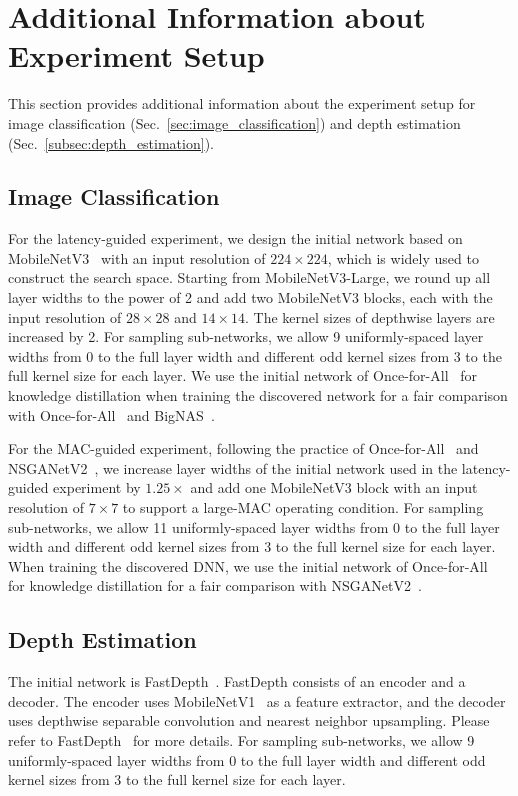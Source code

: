 \section{Additional Information about Experiment Setup}
This section provides additional information about the experiment setup for image classification (Sec.~\ref{sec:image_classification}) and depth estimation (Sec.~\ref{subsec:depth_estimation}).

\subsection{Image Classification}

For the latency-guided experiment, we design the initial network based on MobileNetV3~\cite{Howard_2019_ICCV} with an input resolution of $224\times224$, which is widely used to construct the search space. Starting from MobileNetV3-Large, we round up all layer widths to the power of 2 and add two MobileNetV3 blocks, each with the input resolution of $28\times28$ and $14\times14$. The kernel sizes of depthwise layers are increased by 2. For sampling sub-networks, we allow 9 uniformly-spaced layer widths from 0 to the full layer width and different odd kernel sizes from 3 to the full kernel size for each layer. We use the initial network of Once-for-All~\cite{cai2020once} for knowledge distillation when training the discovered network for a fair comparison with Once-for-All~\cite{cai2020once} and BigNAS~\cite{yu2020bignas}.

For the MAC-guided experiment, following the practice of Once-for-All~\cite{cai2020once} and NSGANetV2~\cite{lu2020nsganetv2}, we increase layer widths of the initial network used in the latency-guided experiment by $1.25 \times$ and add one MobileNetV3 block with an input resolution of $7 \times 7$ to support a large-MAC operating condition. For sampling sub-networks, we allow 11 uniformly-spaced layer widths from 0 to the full layer width and different odd kernel sizes from 3 to the full kernel size for each layer. When training the discovered DNN, we use the initial network of Once-for-All~\cite{cai2020once} for knowledge distillation for a fair comparison with NSGANetV2~\cite{lu2020nsganetv2}.


\subsection{Depth Estimation}

The initial network is FastDepth~\cite{icra_2019_fastdepth}. FastDepth consists of an encoder and a decoder. The encoder uses MobileNetV1~\cite{Howard2017MobileNetV1} as a feature extractor, and the decoder uses depthwise separable convolution and nearest neighbor upsampling. Please refer to FastDepth~\cite{icra_2019_fastdepth} for more details. For sampling sub-networks, we allow 9 uniformly-spaced layer widths from 0 to the full layer width and different odd kernel sizes from 3 to the full kernel size for each layer.


